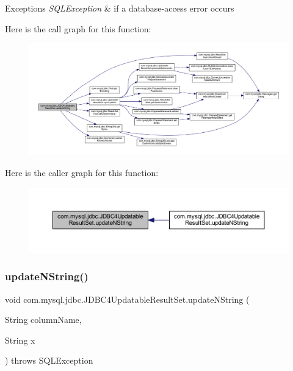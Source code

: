 \begin{DoxyExceptions}{Exceptions}
{\em S\+Q\+L\+Exception} & if a database-\/access error occurs \\
\hline
\end{DoxyExceptions}
Here is the call graph for this function\+:
\nopagebreak
\begin{figure}[H]
\begin{center}
\leavevmode
\includegraphics[width=350pt]{classcom_1_1mysql_1_1jdbc_1_1_j_d_b_c4_updatable_result_set_acbeb1ce191cafe06f0932661770954f6_cgraph}
\end{center}
\end{figure}
Here is the caller graph for this function\+:
\nopagebreak
\begin{figure}[H]
\begin{center}
\leavevmode
\includegraphics[width=350pt]{classcom_1_1mysql_1_1jdbc_1_1_j_d_b_c4_updatable_result_set_acbeb1ce191cafe06f0932661770954f6_icgraph}
\end{center}
\end{figure}
\mbox{\label{classcom_1_1mysql_1_1jdbc_1_1_j_d_b_c4_updatable_result_set_ab67b1ef75d44720f30b8b976b73d6ec5}} 
\subsubsection{\texorpdfstring{update\+N\+String()}{updateNString()}\hspace{0.1cm}{\footnotesize\ttfamily [2/2]}}
{\footnotesize\ttfamily void com.\+mysql.\+jdbc.\+J\+D\+B\+C4\+Updatable\+Result\+Set.\+update\+N\+String (\begin{DoxyParamCaption}\item[{String}]{column\+Name,  }\item[{String}]{x }\end{DoxyParamCaption}) throws S\+Q\+L\+Exception}

